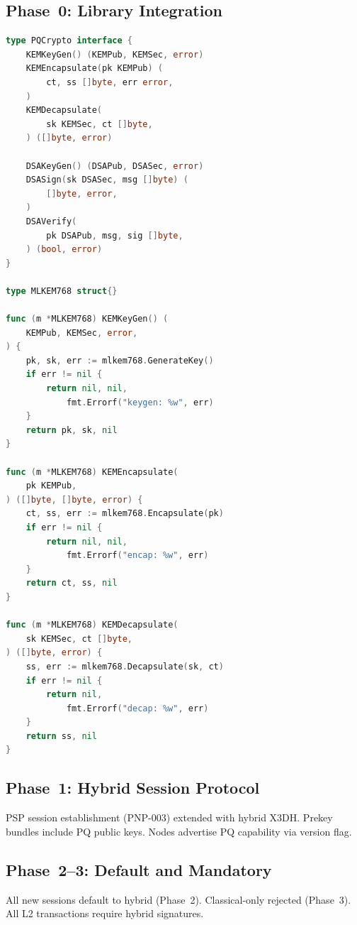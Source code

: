 \documentclass[11pt,a4paper]{article}
\begin{document}
\subsection{Phase~0: Library Integration}

\begin{lstlisting}[language=Go,caption={PQ Crypto Interface}]
type PQCrypto interface {
    KEMKeyGen() (KEMPub, KEMSec, error)
    KEMEncapsulate(pk KEMPub) (
        ct, ss []byte, err error,
    )
    KEMDecapsulate(
        sk KEMSec, ct []byte,
    ) ([]byte, error)

    DSAKeyGen() (DSAPub, DSASec, error)
    DSASign(sk DSASec, msg []byte) (
        []byte, error,
    )
    DSAVerify(
        pk DSAPub, msg, sig []byte,
    ) (bool, error)
}

type MLKEM768 struct{}

func (m *MLKEM768) KEMKeyGen() (
    KEMPub, KEMSec, error,
) {
    pk, sk, err := mlkem768.GenerateKey()
    if err != nil {
        return nil, nil,
            fmt.Errorf("keygen: %w", err)
    }
    return pk, sk, nil
}

func (m *MLKEM768) KEMEncapsulate(
    pk KEMPub,
) ([]byte, []byte, error) {
    ct, ss, err := mlkem768.Encapsulate(pk)
    if err != nil {
        return nil, nil,
            fmt.Errorf("encap: %w", err)
    }
    return ct, ss, nil
}

func (m *MLKEM768) KEMDecapsulate(
    sk KEMSec, ct []byte,
) ([]byte, error) {
    ss, err := mlkem768.Decapsulate(sk, ct)
    if err != nil {
        return nil,
            fmt.Errorf("decap: %w", err)
    }
    return ss, nil
}
\end{lstlisting}

\subsection{Phase~1: Hybrid Session Protocol}

PSP session establishment (PNP-003) extended with hybrid X3DH.  Prekey
bundles include PQ public keys.  Nodes advertise PQ capability via
version flag.

\subsection{Phase~2--3: Default and Mandatory}

All new sessions default to hybrid (Phase~2).  Classical-only rejected
(Phase~3).  All L2 transactions require hybrid signatures.
\end{document}
